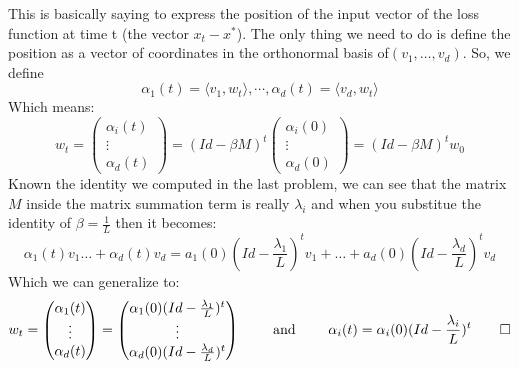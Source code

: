 \documentclass[12pt,twoside]{article}
\begin{document}
This is basically saying to express the position of the input vector of the loss function at time t (the vector $x_t-x^*$). The only thing we need to do is define the position as a vector of coordinates in the orthonormal basis of$(v_1, \dots, v_d)$. So, we define
$$
\alpha_1(t) = \langle v_1, w_t \rangle, \cdots, \alpha_d(t) = \langle v_d, w_t \rangle
$$
Which means:
$$
    w_t = \begin{pmatrix} \alpha_i(t) \\ 
    \vdots \\
    \alpha_d(t)
    \end{pmatrix} = 
    (Id-\beta M)^t \begin{pmatrix} \alpha_i(0) \\ 
    \vdots \\
    \alpha_d(0)
    \end{pmatrix} = (Id-\beta M)^t w_0
$$
Known the identity we computed in the last problem, we can see that the matrix $M$ inside the matrix summation term is really $\lambda_i$ and when you substitue the identity of $\beta=\frac{1}{L}$ then it becomes:
$$
    \alpha_1(t)v_1  \dots + \alpha_d(t) v_d = a_1(0) (Id-\frac{\lambda_1}{L})^tv_1 + \dots + a_d(0) (Id-\frac{\lambda_d}{L})^tv_d
$$
Which we can generalize to:
$$
w_t = \begin{pmatrix} 
\alpha_1(t)\\
\vdots \\ 
\alpha_d(t)
\end{pmatrix} = \begin{pmatrix} 
\alpha_1(0)(Id-\frac{\lambda_1}{L})^t\\
\vdots \\ 
\alpha_d(0)(Id-\frac{\lambda_d}{L})^t
\end{pmatrix} \qquad 
\text{ and } \qquad \alpha_i(t) = \alpha_i(0)(Id-\frac{\lambda_i}{L})^t \qed
$$


	
\newpage 
\end{document}
